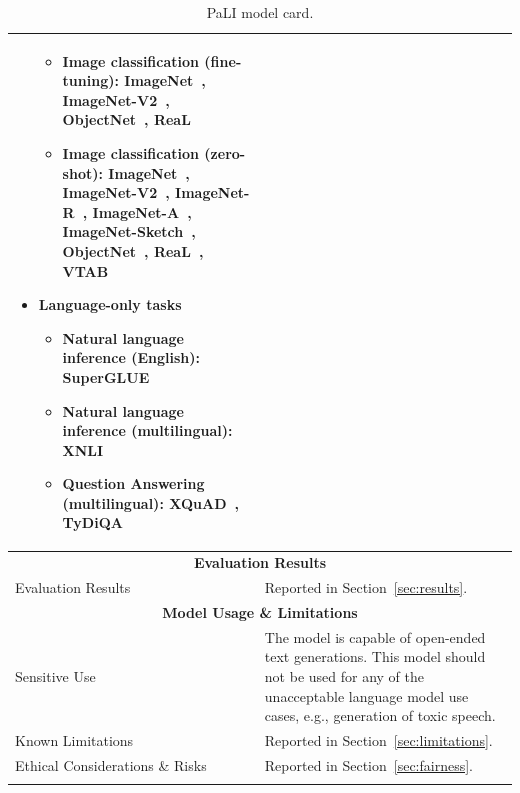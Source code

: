 \begin{longtable}[c]{ p{} | p{} }
\begin{itemize}
\begin{itemize}
            \item \textbf{Image classification (fine-tuning)}: ImageNet~\citep{deng2009imagenet}, ImageNet-V2~\citep{recht2019imagenet}, ObjectNet~\citep{objectnet},
            ReaL~\citep{imagenet_real}
            \item \textbf{Image classification (zero-shot)}: ImageNet~\citep{deng2009imagenet}, ImageNet-V2~\citep{recht2019imagenet}, ImageNet-R~\citep{hendrycks2021many}, ImageNet-A~\citep{hendrycks2021nae}, ImageNet-Sketch~\citep{wang2019learning}, ObjectNet~\citep{objectnet},
            ReaL~\citep{imagenet_real},
            VTAB~\citep{vtab}
        \end{itemize}
    \item \textbf{Language-only tasks}
        \begin{itemize}
            \item \textbf{Natural language inference (English)}: SuperGLUE~\citep{wang-2019-superglue}
            \item Natural language inference (multilingual): XNLI~\citep{conneau-etal-2018-xnli}
            \item \textbf{Question Answering (multilingual)}: XQuAD~\citep{artetxe-etal-2020-cross}, TyDiQA~\citep{clark-etal-2020-tydi}
        \end{itemize}
\end{itemize}    \\
\toprule

\multicolumn{2}{c}{\textbf{Evaluation Results}}      \\ \toprule
\multicolumn{1}{l|}{Evaluation Results} & Reported in Section~\ref{sec:results}. \\ 
\toprule

\multicolumn{2}{c}{\textbf{Model Usage \& Limitations}}      \\ \toprule
\multicolumn{1}{l|}{Sensitive Use} & The model is capable of open-ended text generations. This model should not be used for any of the unacceptable language model use cases, e.g., generation of toxic speech.  \\ \midrule
\multicolumn{1}{l|}{Known Limitations} & Reported in Section~\ref{sec:limitations}. \\ \midrule
\multicolumn{1}{l|}{Ethical Considerations \& Risks} & Reported in Section~\ref{sec:fairness}. \\

\bottomrule
\caption{PaLI model card.}
\label{tab:modelcard}
\end{longtable}